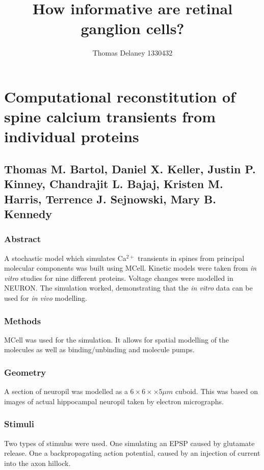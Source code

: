 \documentclass[a4paper,12pt]{article}
\title{How informative are retinal ganglion cells?}
\author{Thomas Delaney 1330432}
\theoremstyle{definition}
\begin{document}
\section*{Computational reconstitution of spine calcium transients from individual proteins}
\subsection*{Thomas M. Bartol, Daniel X. Keller, Justin P. Kinney, Chandrajit L. Bajaj, Kristen M. Harris, Terrence J. Sejnowski, Mary B. Kennedy}

\subsubsection*{Abstract}
	A stochastic model which simulates Ca$^{2+}$ transients in spines from principal molecular components was built using MCell. Kinetic models were taken from \textit{in vitro} studies for nine different proteins. Voltage changes were modelled in NEURON. The simulation worked, demonstrating that the \textit{in vitro} data can be used for \textit{in vivo} modelling.
	
\subsubsection*{Methods}
	MCell was used for the simulation. It allows for spatial modelling of the molecules as well as binding/unbinding and molecule pumps.
	
\subsubsection*{Geometry}
	A section of neuropil was modelled as a $6 \times 6 \times \times 5 \mu m$ cuboid. This was based on images of actual hippocampal neuropil taken by electron micrographs.
	
\subsubsection*{Stimuli}
	Two types of stimulus were used. One simulating an EPSP caused by glutamate release. One a backpropagating action potential, caused by an injection of current into the axon hillock.
	
\end{document}
